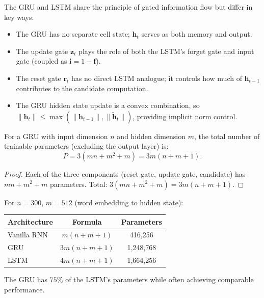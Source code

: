 \documentclass[11pt,a4paper]{article}
\begin{document}
\begin{remark}
\label{rem:gru-vs-lstm}
The GRU and LSTM share the principle of gated information flow but
differ in key ways:
\begin{itemize}[nosep]
  \item The GRU has no separate cell state; $\mathbf{h}_t$ serves
    as both memory and output.
  \item The update gate $\mathbf{z}_t$ plays the role of both the
    LSTM's forget gate and input gate (coupled as
    $\mathbf{i} = 1 - \mathbf{f}$).
  \item The reset gate $\mathbf{r}_t$ has no direct LSTM analogue;
    it controls how much of $\mathbf{h}_{t-1}$ contributes to the
    candidate computation.
  \item The GRU hidden state update is a convex combination, so
    $\|\mathbf{h}_t\| \leq \max(\|\mathbf{h}_{t-1}\|,
    \|\tilde{\mathbf{h}}_t\|)$, providing implicit norm control.
\end{itemize}
\end{remark}

\begin{proposition}
\label{prop:gru-params}
For a GRU with input dimension $n$ and hidden dimension $m$, the
total number of trainable parameters (excluding the output layer) is:
\begin{equation}
  P = 3(mn + m^2 + m) = 3m(n + m + 1).
  \label{eq:gru-params}
\end{equation}
\end{proposition}

\begin{proof}
Each of the three components (reset gate, update gate, candidate)
has $mn + m^2 + m$ parameters.  Total:
$3(mn + m^2 + m) = 3m(n + m + 1)$.
\end{proof}

\begin{example}
\label{ex:param-comparison}
For $n = 300$, $m = 512$ (word embedding to hidden state):
\begin{center}
\begin{tabular}{lcc}
\toprule
Architecture & Formula & Parameters \\
\midrule
Vanilla RNN & $m(n + m + 1)$ & 416,256 \\
GRU & $3m(n + m + 1)$ & 1,248,768 \\
LSTM & $4m(n + m + 1)$ & 1,664,256 \\
\bottomrule
\end{tabular}
\end{center}
The GRU has $75\%$ of the LSTM's parameters while often achieving
comparable performance.
\end{example}
\end{document}
